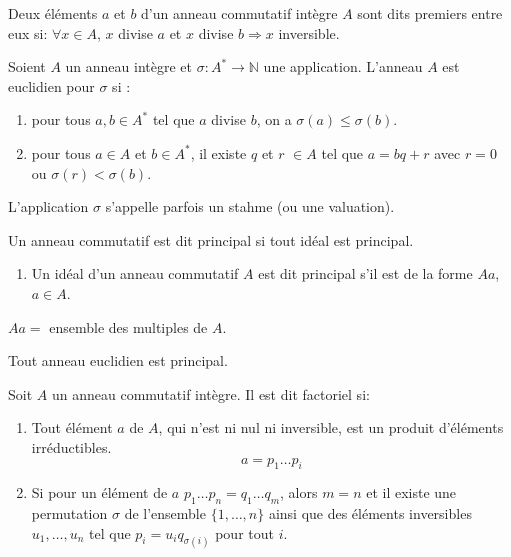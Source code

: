 \documentclass[12pt,a4paper]{article}
\begin{document}
\begin{flushleft}
\begin{mydef}
Deux éléments $a$ et $b$ d'un anneau commutatif intègre $A$ sont dits premiers entre eux si: $\forall x \in A$, $x $ divise $a$ et $x$ divise $b \Rightarrow x$ inversible.
\end{mydef}

\begin{mydef}
Soient $A$ un anneau intègre et $\sigma : A^* \longrightarrow \mathbb{N}$ une application. L'anneau $A$ est euclidien pour $\sigma$ si :
\begin{enumerate}
\item pour tous $a, b \in A^*$ tel que $a$ divise $b$, on a $\sigma(a) \leq \sigma(b)$.
\item pour tous $a \in A$ et $b \in A^*$, il existe $q$ et $r$ $\in A$ tel que $a = bq + r$ avec $r = 0$ ou $\sigma(r) < \sigma(b)$.
\end{enumerate}
L'application $\sigma$ s'appelle parfois un stahme (ou une valuation).
\end{mydef}

\begin{mydef}
Un anneau commutatif est dit principal si tout idéal est principal.
\begin{enumerate}
\item Un idéal d'un anneau commutatif $A$ est dit principal s'il est de la forme $Aa$, $a \in A$.
\end{enumerate}
\end{mydef}

\begin{rem}
$Aa = $ ensemble des multiples de $A$.
\end{rem}

\begin{thm}
Tout anneau euclidien est principal.
\end{thm}

\begin{mydef}
Soit $A$ un anneau commutatif intègre. Il est dit factoriel si: 
\begin{enumerate}
\item Tout élément $a$ de $A$, qui n'est ni nul ni inversible, est un produit d'éléments irréductibles.
$$ a = p_1 \ldots p_i$$
\item Si pour un élément de $a$ $p_1 \ldots p_n = q_1 \ldots q_m$, alors $m = n$ et il existe une 	permutation $\sigma$ de l'ensemble $\{ 1, \ldots , n \}$ ainsi que des éléments inversibles $u_1 , \ldots , u_n$ tel que $p_i = u_i q_{\sigma (i)}$ pour tout $i$.
\end{enumerate}
\end{mydef}


\end{flushleft}
\end{document}
